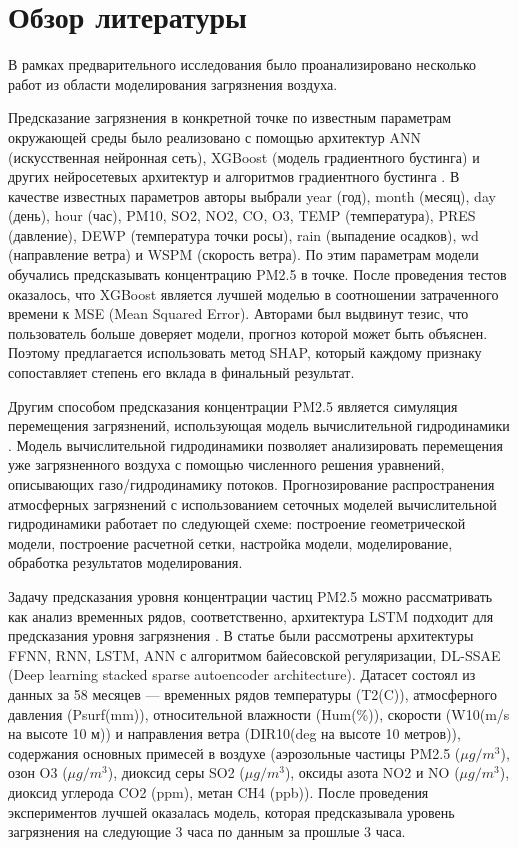 \documentclass[12pt]{article}
\begin{document}
\newpage

\section{Обзор литературы}


В рамках предварительного исследования было проанализировано несколько работ из области моделирования загрязнения воздуха.

Предсказание загрязнения в конкретной точке по известным параметрам окружающей среды было реализовано с помощью архитектур ANN (искусственная нейронная сеть), XGBoost (модель градиентного бустинга) и других нейросетевых архитектур и алгоритмов градиентного бустинга \cite{tcibure2024}. В качестве известных параметров авторы выбрали 
year (год), month (месяц), day (день), hour (час), PM10, SO2, NO2, CO, O3, TEMP
(температура), PRES (давление), DEWP (температура точки росы), rain
(выпадение осадков), wd (направление ветра) и WSPM (скорость ветра). 
По этим параметрам модели обучались предсказывать концентрацию PM2.5 в точке. 
После проведения тестов оказалось, что XGBoost является лучшей моделью в соотношении затраченного времени к MSE (Mean Squared Error). 
Авторами был выдвинут тезис, что пользователь больше доверяет модели, прогноз которой может быть объяснен. 
Поэтому предлагается использовать метод SHAP, который каждому признаку сопоставляет степень его вклада в финальный результат.

Другим способом предсказания концентрации PM2.5 является симуляция перемещения загрязнений, использующая модель вычислительной гидродинамики \cite{pozharkova2023}. 
Модель вычислительной гидродинамики позволяет анализировать перемещения уже загрязненного воздуха с помощью численного решения уравнений, описывающих газо/гидродинамику потоков. 
Прогнозирование распространения атмосферных загрязнений с использованием сеточных моделей вычислительной гидродинамики работает по следующей схеме:
построение геометрической модели, построение расчетной сетки, настройка модели, моделирование, обработка результатов моделирования. 

Задачу предсказания уровня концентрации частиц PM2.5 можно рассматривать как анализ временных рядов, соответственно, архитектура LSTM подходит для предсказания уровня загрязнения \cite{delstarchenko2023}.
В статье были рассмотрены архитектуры FFNN, RNN, LSTM, ANN с алгоритмом байесовской
регуляризации, DL-SSAE (Deep learning stacked sparse autoencoder architecture). Датасет состоял из данных за 58 месяцев --- временных рядов температуры
(T2(C)), атмосферного давления (Psurf(mm)), относительной влажности
(Hum(\%)), скорости (W10(m/s на высоте 10 м)) и направления ветра (DIR10(deg на высоте 10 метров)), содержания
основных примесей в воздухе (аэрозольные частицы PM2.5 ($\mu g / m^3$), озон O3
($\mu g / m^3$), диоксид серы SO2 ($\mu g / m^3$), оксиды азота NO2 и NO ($\mu g / m^3$), диоксид
углерода CO2 (ppm), метан CH4 (ppb)). После проведения экспериментов лучшей оказалась модель, которая предсказывала уровень загрязнения на следующие 3 часа по данным за прошлые 3 часа.
\end{document}
